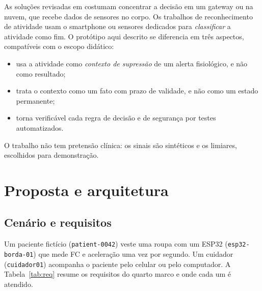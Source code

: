 \documentclass[12pt,a4paper]{article}
\begin{document}
As soluções revisadas em \cite{islam2015} costumam concentrar a decisão em um gateway ou na nuvem, que recebe dados de sensores no corpo.
Os trabalhos de reconhecimento de atividade \cite{lara2013} usam o smartphone ou sensores dedicados para \emph{classificar} a atividade como fim.
O protótipo aqui descrito se diferencia em três aspectos, compatíveis com o escopo didático:
\begin{itemize}
  \item usa a atividade como \emph{contexto de supressão} de um alerta fisiológico, e não como resultado;
  \item trata o contexto como um fato com prazo de validade, e não como um estado permanente;
  \item torna verificável cada regra de decisão e de segurança por testes automatizados.
\end{itemize}
O trabalho não tem pretensão clínica: os sinais são sintéticos e os limiares, escolhidos para demonstração.

\section{Proposta e arquitetura}\label{sec:arq}

\subsection{Cenário e requisitos}

Um paciente fictício (\texttt{patient-0042}) veste uma roupa com um ESP32 (\texttt{esp32-borda-01}) que mede FC e aceleração uma vez por segundo.
Um cuidador (\texttt{cuidador01}) acompanha o paciente pelo celular ou pelo computador.
A Tabela~\ref{tab:req} resume os requisitos do quarto marco e onde cada um é atendido.
\end{document}
